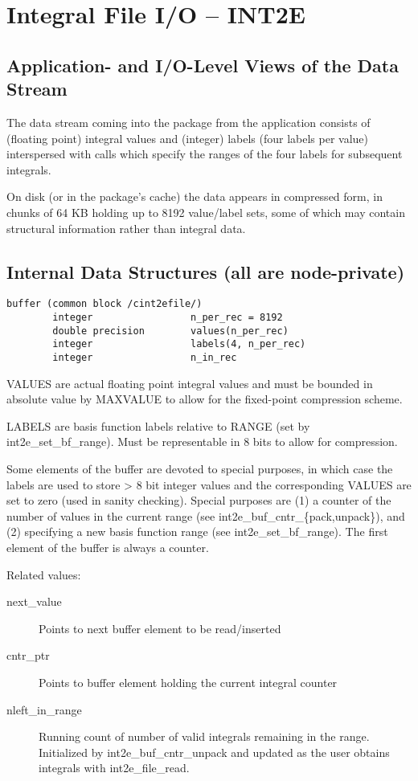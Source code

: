 \section{Integral File I/O -- INT2E}

\subsection{Application- and I/O-Level Views of the Data Stream}

The data stream coming into the package from the application consists
of (floating point) integral values and (integer) labels (four labels
per value) interspersed with calls which specify the ranges of the
four labels for subsequent integrals.

On disk (or in the package's cache) the data appears in compressed
form, in chunks of 64 KB holding up to 8192 value/label sets, some of
which may contain structural information rather than integral data.

\subsection{Internal Data Structures (all are node-private)}

\begin{verbatim}
buffer (common block /cint2efile/)
        integer                 n_per_rec = 8192
        double precision        values(n_per_rec)
        integer                 labels(4, n_per_rec)
        integer                 n_in_rec
\end{verbatim}
VALUES are actual floating point integral values and must be bounded
in absolute value by MAXVALUE to allow for the fixed-point compression
scheme.

LABELS are basis function labels relative to RANGE (set by
int2e\_set\_bf\_range).  Must be representable in 8 bits to allow for
compression.

Some elements of the buffer are devoted to special purposes, in which
case the labels are used to store > 8 bit integer values and the
corresponding VALUES are set to zero (used in sanity checking).
Special purposes are (1) a counter of the number of values in the
current range (see int2e\_buf\_cntr\_\{pack,unpack\}), and (2) specifying a
new basis function range (see int2e\_set\_bf\_range).  The first element
of the buffer is always a counter.

Related values:
\begin{description}
\item[next\_value]       Points to next buffer element to be read/inserted
\item[cntr\_ptr]         Points to buffer element holding the current
                        integral counter
\item[nleft\_in\_range]   Running count of number of valid integrals
                        remaining in the range.  Initialized by
                        int2e\_buf\_cntr\_unpack and updated as the user
                        obtains integrals with int2e\_file\_read.
\end{description}

